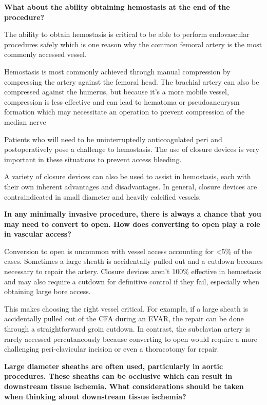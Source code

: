 \documentclass[
]{book}
\begin{document}
\textbf{What about the ability obtaining hemostasis at the end of the
procedure?}

The ability to obtain hemostasis is critical to be able to perform
endovascular procedures safely which is one reason why the common
femoral artery is the most commonly accessed vessel.

Hemostasis is most commonly achieved through manual compression by
compressing the artery against the femoral head. The brachial artery can
also be compressed against the humerus, but because it's a more mobile
vessel, compression is less effective and can lead to hematoma or
pseudoaneurysm formation which may necessitate an operation to prevent
compression of the median nerve

Patients who will need to be uninterruptedly anticoagulated peri and
postoperatively pose a challenge to hemostasis. The use of closure
devices is very important in these situations to prevent access
bleeding.

A variety of closure devices can also be used to assist in hemostasis,
each with their own inherent advantages and disadvantages. In general,
closure devices are contraindicated in small diameter and heavily
calcified vessels.

\textbf{In any minimally invasive procedure, there is always a chance that you
may need to convert to open. How does converting to open play a role in
vascular access?}

Conversion to open is uncommon with vessel access accounting for \textless5\% of
the cases. Sometimes a large sheath is accidentally pulled out and a
cutdown becomes necessary to repair the artery. Closure devices aren't
100\% effective in hemostasis and may also require a cutdown for
definitive control if they fail, especially when obtaining large bore
access.

This makes choosing the right vessel critical. For example, if a large
sheath is accidentally pulled out of the CFA during an EVAR, the repair
can be done through a straightforward groin cutdown. In contrast, the
subclavian artery is rarely accessed percutaneously because converting
to open would require a more challenging peri-clavicular incision or
even a thoracotomy for repair.

\textbf{Large diameter sheaths are often used, particularly in aortic
procedures. These sheaths can be occlusive which can result in
downstream tissue ischemia. What considerations should be taken when
thinking about downstream tissue ischemia?}
\end{document}
